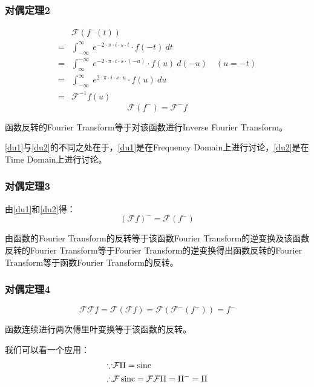 \subsubsection{对偶定理2}
\begin{align*}
	  & \mathcal{F}(f^-(t))                                                                            \\
	= & \int_{-\infty}^{\infty}\ e^{-2\cdot \pi\cdot i\cdot s\cdot t}\cdot f(-t)\ dt                   \\
	= & \int_{\infty}^{-\infty}\ e^{-2\cdot \pi\cdot i\cdot s\cdot (-u)}\cdot f(u)\ d(-u) \quad (u=-t) \\
	= & \int_{-\infty}^{\infty}\ e^{2\cdot \pi\cdot i\cdot s\cdot u}\cdot f(u)\ du                     \\
	= & \mathcal{F}^{-1}f(u)
\end{align*}
\begin{equation}\label{du2}
	\mathcal{F}(f^-)=\mathcal{F}^-f
\end{equation}

函数反转的Fourier Transform等于对该函数进行Inverse Fourier Transform。

\eqref{du1}与\eqref{du2}的不同之处在于，\eqref{du1}是在Frequency Domain上进行讨论，\eqref{du2}是在Time Domain上进行讨论。
\subsubsection{对偶定理3}
由\eqref{du1}和\eqref{du2}得：
\begin{equation}\label{du3}
	(\mathcal{F}f)^-=\mathcal{F}(f^-)
\end{equation}

由函数的Fourier Transform的反转等于该函数Fourier Transform的逆变换及该函数反转的Fourier Transform等于Fourier Transform的逆变换得出函数反转的Fourier Transform等于函数Fourier Transform的反转。
\subsubsection{对偶定理4}
\begin{equation}
	\mathcal{F}\mathcal{F}f= \mathcal{F}(\mathcal{F}f)=\mathcal{F}(\mathcal{F}^-(f^-)) =  f^-
\end{equation}

函数连续进行两次傅里叶变换等于该函数的反转。

我们可以看一个应用：
\begin{align*}
	\because   & \mathcal{F}\Pi=\operatorname{sinc}                                 \\
	\therefore & \mathcal{F}\operatorname{sinc}=\mathcal{F}\mathcal{F}\Pi=\Pi^-=\Pi
\end{align*}

